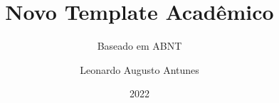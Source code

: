 \documentclass{AcademicNew}
\author{Leonardo Augusto Antunes}
\title{Novo Template Acadêmico}
\subtitle{Baseado em ABNT}
\date{2022}
\begin{document}
    \cover
    \titlePage
    \contents
    
    
    \biblio
    
\end{document}
